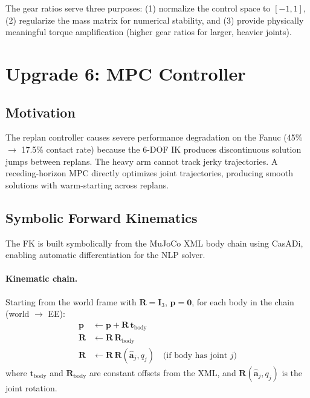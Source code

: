 \documentclass[11pt,letterpaper]{article}
\newcommand{\vv}[1]{\mathbf{#1}}
\begin{document}
The gear ratios serve three purposes: (1) normalize the control space to $[-1, 1]$, (2) regularize the mass matrix for numerical stability, and (3) provide physically meaningful torque amplification (higher gear ratios for larger, heavier joints).

\section{Upgrade 6: MPC Controller}
\label{sec:mpc}

\subsection{Motivation}

The replan controller causes severe performance degradation on the Fanuc (45\% $\to$ 17.5\% contact rate) because the 6-DOF IK produces discontinuous solution jumps between replans.  The heavy arm cannot track jerky trajectories.  A receding-horizon MPC directly optimizes joint trajectories, producing smooth solutions with warm-starting across replans.

\subsection{Symbolic Forward Kinematics}
\label{sec:fk}

The FK is built symbolically from the MuJoCo XML body chain using CasADi, enabling automatic differentiation for the NLP solver.

\paragraph{Kinematic chain.}  Starting from the world frame with $\vv{R} = \vv{I}_3$, $\vv{p} = \vv{0}$, for each body in the chain (world $\to$ EE):
\begin{align}
    \vv{p} &\leftarrow \vv{p} + \vv{R}\,\vv{t}_{\text{body}} \\
    \vv{R} &\leftarrow \vv{R}\,\vv{R}_{\text{body}} \\
    \vv{R} &\leftarrow \vv{R}\,\vv{R}(\hat{\vv{a}}_j, q_j) \quad \text{(if body has joint $j$)}
\end{align}
where $\vv{t}_{\text{body}}$ and $\vv{R}_{\text{body}}$ are constant offsets from the XML, and $\vv{R}(\hat{\vv{a}}_j, q_j)$ is the joint rotation.
\end{document}
